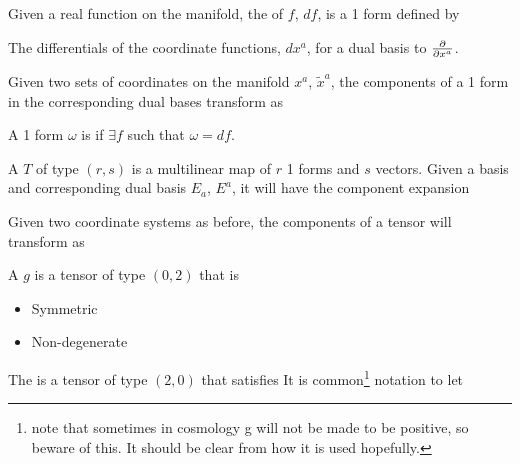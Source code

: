 \documentclass{article}
\begin{document}
\begin{definition}[Differential]
Given a real function on the manifold, the  of $f$, $df$, is a 1 form defined by 
\end{definition}

\begin{lemma}
The differentials of the coordinate functions, $dx^a$, for a dual basis to $\frac{\partial}{\partial x^a}$. 
\end{lemma}

\begin{lemma}
Given two sets of coordinates on the manifold $x^a$, $\tilde{x}^a$, the components of a 1 form in the corresponding dual bases transform as 
\end{lemma}

\begin{definition}[Exact]
A 1 form $\omega$ is  if $\exists f$ such that $\omega = df$. 
\end{definition}

\begin{definition}[Tensor]
A  $T$ of type $(r,s)$ is a multilinear map of $r$ 1 forms and $s$ vectors. Given a basis and corresponding dual basis $E_a$, $E^a$, it will have the component expansion 
\end{definition}

\begin{lemma}
Given two coordinate systems as before, the components of a tensor will transform as 
\end{lemma}

\begin{definition}[Metric]
A  $g$ is a tensor of type $(0,2)$ that is 
\begin{itemize}
    \item Symmetric
    \item Non-degenerate
\end{itemize}
The  is a tensor of type $(2,0)$ that satisfies
It is common\footnote{note that sometimes in cosmology g will not be made to be positive, so beware of this. It should be clear from how it is used hopefully.} notation to let 
\end{definition}
\end{document}
